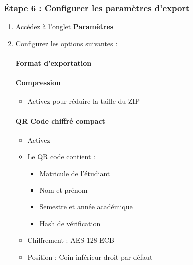 \subsubsection{Étape 6 : Configurer les paramètres d'export}

\begin{enumerate}[leftmargin=*]
    \item Accédez à l'onglet \textbf{Paramètres}
    \item Configurez les options suivantes :

    \paragraph{Format d'exportation}

    \paragraph{Compression}
    \begin{itemize}
        \item Activez  pour réduire la taille du ZIP
    \end{itemize}

    \paragraph{QR Code chiffré compact}
    \begin{itemize}
        \item Activez 
        \item Le QR code contient :
        \begin{itemize}
            \item Matricule de l'étudiant
            \item Nom et prénom
            \item Semestre et année académique
            \item Hash de vérification
        \end{itemize}
        \item Chiffrement : AES-128-ECB
        \item Position : Coin inférieur droit par défaut
    \end{itemize}


\end{enumerate}
